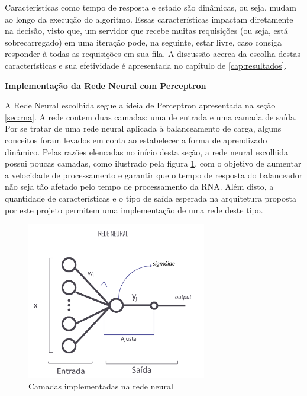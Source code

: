 Características como tempo de resposta e estado são dinâmicas, ou seja, mudam ao longo da execução do algoritmo. Essas características impactam diretamente na decisão, visto que, um servidor que recebe muitas requisições (ou seja, está sobrecarregado) em uma iteração pode, na seguinte, estar livre, caso consiga responder à todas as requisições em sua fila. 
A discussão acerca da escolha destas características e sua efetividade é apresentada no capítulo de \ref{cap:resultados}.

\textbf{Implementação da Rede Neural com Perceptron}


A Rede Neural escolhida segue a ideia de Perceptron apresentada na seção \ref{sec:rna}. A rede contem duas camadas: uma de entrada e uma camada de saída. Por se tratar de uma rede neural aplicada à balanceamento de carga, alguns conceitos foram levados em conta ao estabelecer a forma de aprendizado dinâmico. Pelas razões elencadas no início desta seção, a rede neural escolhida possui poucas camadas, como ilustrado pela figura \ref{fig:rede}, com o objetivo de aumentar a velocidade de processamento e garantir que o tempo de resposta do balanceador não seja tão afetado pelo tempo de processamento da RNA. Além disto, a quantidade de características e o tipo de saída esperada na arquitetura proposta por este projeto permitem uma implementação de uma rede deste tipo. 

\begin{figure}[htb]
	\caption{\label{fig:rede} Camadas implementadas na rede neural}
	\begin{center}
		\includegraphics[width=0.70\textwidth]{img/redeusada.png}
	\end{center}
\end{figure}

